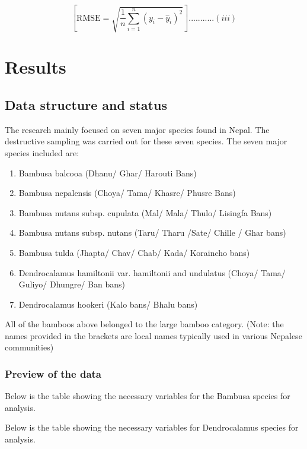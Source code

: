 \documentclass[preprint, 3p,
authoryear]{elsarticle} %
\begin{document}
\[[ \text{RMSE} = \sqrt{\frac{1}{n}\sum_{i=1}^{n}(y_i - \hat{y}_i)^2} ]...........(iii)\]

\hypertarget{results}{%
\section{Results}\label{results}}

\hypertarget{data-structure-and-status}{%
\subsection{Data structure and status}\label{data-structure-and-status}}

The research mainly focused on seven major species found in Nepal. The
destructive sampling was carried out for these seven species. The seven
major species included are:

\begin{enumerate}
\def\labelenumi{\alph{enumi})}
\item
  Bambusa balcooa (Dhanu/ Ghar/ Harouti Bans)
\item
  Bambusa nepalensis (Choya/ Tama/ Khasre/ Phusre Bans)
\item
  Bambusa nutans subsp. cupulata (Mal/ Mala/ Thulo/ Lisingfa Bans)
\item
  Bambusa nutans subsp. nutans (Taru/ Tharu /Sate/ Chille / Ghar bans)
\item
  Bambusa tulda (Jhapta/ Chav/ Chab/ Kada/ Koraincho bans)
\item
  Dendrocalamus hamiltonii var. hamiltonii and undulatus (Choya/ Tama/
  Guliyo/ Dhungre/ Ban bans)
\item
  Dendrocalamus hookeri (Kalo bans/ Bhalu bans)
\end{enumerate}

All of the bamboos above belonged to the large bamboo category. (Note:
the names provided in the brackets are local names typically used in
various Nepalese communities)

\hypertarget{preview-of-the-data}{%
\subsubsection{Preview of the data}\label{preview-of-the-data}}

Below is the table showing the necessary variables for the Bambusa
species for analysis.

Below is the table showing the necessary variables for Dendrocalamus
species for analysis.
\end{document}
